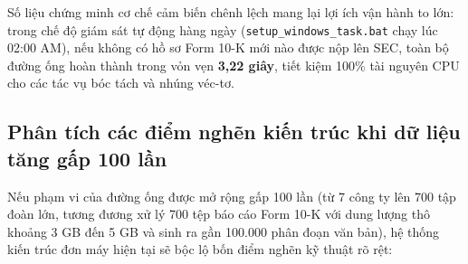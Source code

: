 Số liệu chứng minh cơ chế cảm biến chênh lệch mang lại lợi ích vận hành to lớn: trong chế độ giám sát tự động hàng ngày (\texttt{setup\_windows\_task.bat} chạy lúc 02:00 AM), nếu không có hồ sơ Form 10-K mới nào được nộp lên SEC, toàn bộ đường ống hoàn thành trong vỏn vẹn \textbf{3,22 giây}, tiết kiệm 100\% tài nguyên CPU cho các tác vụ bóc tách và nhúng véc-tơ.

\subsection{Phân tích các điểm nghẽn kiến trúc khi dữ liệu tăng gấp 100 lần}
Nếu phạm vi của đường ống được mở rộng gấp 100 lần (từ 7 công ty lên 700 tập đoàn lớn, tương đương xử lý 700 tệp báo cáo Form 10-K với dung lượng thô khoảng 3 GB đến 5 GB và sinh ra gần 100.000 phân đoạn văn bản), hệ thống kiến trúc đơn máy hiện tại sẽ bộc lộ bốn điểm nghẽn kỹ thuật rõ rệt:

